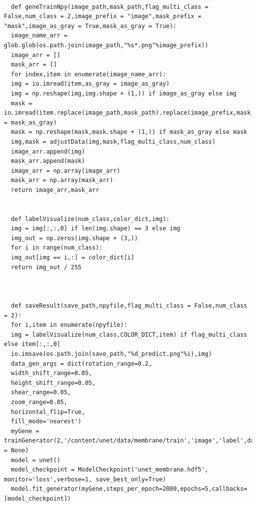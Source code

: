 \documentclass[times]{itmo-student-thesis}
\begin{document}
\begin{lstlisting}[caption={Реализация сети Unet},label={lstX}]
  
  def geneTrainNpy(image_path,mask_path,flag_multi_class = False,num_class = 2,image_prefix = "image",mask_prefix = "mask",image_as_gray = True,mask_as_gray = True):
  image_name_arr = glob.glob(os.path.join(image_path,"%s*.png"%image_prefix))
  image_arr = []
  mask_arr = []
  for index,item in enumerate(image_name_arr):
  img = io.imread(item,as_gray = image_as_gray)
  img = np.reshape(img,img.shape + (1,)) if image_as_gray else img
  mask = io.imread(item.replace(image_path,mask_path).replace(image_prefix,mask_prefix),as_gray = mask_as_gray)
  mask = np.reshape(mask,mask.shape + (1,)) if mask_as_gray else mask
  img,mask = adjustData(img,mask,flag_multi_class,num_class)
  image_arr.append(img)
  mask_arr.append(mask)
  image_arr = np.array(image_arr)
  mask_arr = np.array(mask_arr)
  return image_arr,mask_arr
  
  
  def labelVisualize(num_class,color_dict,img):
  img = img[:,:,0] if len(img.shape) == 3 else img
  img_out = np.zeros(img.shape + (3,))
  for i in range(num_class):
  img_out[img == i,:] = color_dict[i]
  return img_out / 255
  
  
  
  def saveResult(save_path,npyfile,flag_multi_class = False,num_class = 2):
  for i,item in enumerate(npyfile):
  img = labelVisualize(num_class,COLOR_DICT,item) if flag_multi_class else item[:,:,0]
  io.imsave(os.path.join(save_path,"%d_predict.png"%i),img)
  data_gen_args = dict(rotation_range=0.2,
  width_shift_range=0.05,
  height_shift_range=0.05,
  shear_range=0.05,
  zoom_range=0.05,
  horizontal_flip=True,
  fill_mode='nearest')
  myGene = trainGenerator(2,'/content/unet/data/membrane/train','image','label',data_gen_args,save_to_dir = None)
  model = unet()
  model_checkpoint = ModelCheckpoint('unet_membrane.hdf5', monitor='loss',verbose=1, save_best_only=True)
  model.fit_generator(myGene,steps_per_epoch=2000,epochs=5,callbacks=[model_checkpoint])
  \end{lstlisting}
  
\end{document}
